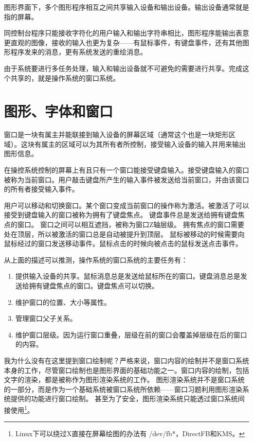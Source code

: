 \documentclass[amstex,twoside]{ctexbook}
\begin{document}
图形界面下，多个图形程序相互之间共享输入设备和输出设备。输出设备通常就是指的屏幕。

同控制台程序只能接收字符化的用户输入和输出字符串相比，图形程序能输出表意更直观的图像，接收的输入也更为复杂——有鼠标事件，有键盘事件，还有其他图形程序发来的消息，更有系统发送的重绘消息。

由于系统要进行多任务处理，输入和输出设备就不可避免的需要进行共享。完成这个共享的，就是操作系统的窗口系统。

\section{图形、字体和窗口}

窗口是一块有属主并能联接到输入设备的屏幕区域（通常这个也是一块矩形区域）。这块有属主的区域可以为其所有者所控制，接受输入设备的输入并用来输出图形信息。

在操控系统控制的屏幕上有且只有一个窗口能接受键盘输入。接受键盘输入的窗口被称为当前窗口。用户敲击键盘所产生的输入事件被发送给当前窗口，并由该窗口的所有者接受输入事件。

用户可以移动和切换窗口。某个窗口变成当前窗口的操作称为激活。被激活了可以接受到键盘输入的窗口被称为拥有了键盘焦点。
键盘事件总是发送给拥有键盘焦点的窗口。
窗口之间可以相互遮挡，被称为窗口Z轴层级。
拥有焦点的窗口需要处在顶层，所以被激活的窗口总是自动被提升到顶层。
鼠标被移动的时候需要向鼠标经过的窗口发送移动事件。鼠标点击的时候向被点击的鼠标发送点击事件。

从上面的描述可以推测，操作系统的窗口系统的主要任务有：

\begin{enumerate}

\item	提供输入设备的共享。鼠标消息总是发送给鼠标所在的窗口。键盘消息总是发送给拥有键盘焦点的窗口。键盘焦点可以切换。

\item	维护窗口的位置、大小等属性。

\item	管理窗口父子关系。

\item	维护窗口层级。因为运行窗口重叠，层级在前的窗口会覆盖掉层级在后的窗口的内容。

\end{enumerate}

我为什么没有在这里提到窗口绘制呢？严格来说，窗口内容的绘制并不是窗口系统本身的工作，尽管窗口绘制也是图形界面的基础功能之一。窗口内容的绘制，包括文字的渲染，都是被称作为图形渲染系统的工作。
图形渲染系统并不是窗口系统的一部分，而是作为一个基础系统被窗口系统所依赖——窗口习题利用图形渲染系统提供的功能进行窗口绘制。
甚至为了安全，图形渲染系统只能透过窗口系统间接使用\footnote{Linux下可以绕过X直接在屏幕绘图的办法有
/dev/fb*，DirectFB和KMS。}。
\end{document}

